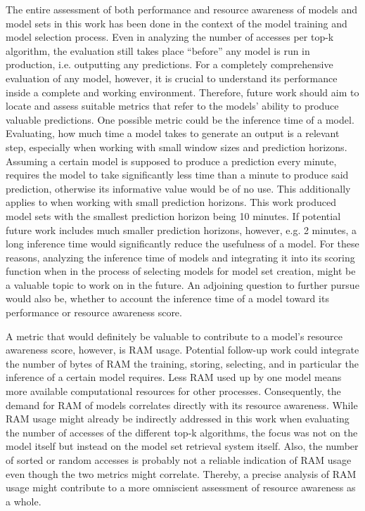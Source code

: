 The entire assessment of both performance and resource awareness of models and model sets in this work has been done in the context of the model training and model selection process. Even in analyzing the number of accesses per top-k algorithm, the evaluation still takes place “before” any model is run in production, i.e. outputting any predictions. For a completely comprehensive evaluation of any model, however, it is crucial to understand its performance inside a complete and working environment. Therefore, future work should aim to locate and assess suitable metrics that refer to the models' ability to produce valuable predictions. One possible metric could be the inference time of a model. Evaluating, how much time a model takes to generate an output is a relevant step, especially when working with small window sizes and prediction horizons. Assuming a certain model is supposed to produce a prediction every minute, requires the model to take significantly less time than a minute to produce said prediction, otherwise its informative value would be of no use. This additionally applies to when working with small prediction horizons. This work produced model sets with the smallest prediction horizon being 10 minutes. If potential future work includes much smaller prediction horizons, however, e.g. 2 minutes, a long inference time would significantly reduce the usefulness of a model. For these reasons, analyzing the inference time of models and integrating it into its scoring function when in the process of selecting models for model set creation, might be a valuable topic to work on in the future. An adjoining question to further pursue would also be, whether to account the inference time of a model toward its performance or resource awareness score. 

A metric that would definitely be valuable to contribute to a model's resource awareness score, however, is RAM usage. Potential follow-up work could integrate the number of bytes of RAM the training, storing, selecting, and in particular the inference of a certain model requires. Less RAM used up by one model means more available computational resources for other processes. Consequently, the demand for RAM of models correlates directly with its resource awareness. While RAM usage might already be indirectly addressed in this work when evaluating the number of accesses of the different top-k algorithms, the focus was not on the model itself but instead on the model set retrieval system itself. Also, the number of sorted or random accesses is probably not a reliable indication of RAM usage even though the two metrics might correlate. Thereby, a precise analysis of RAM usage might contribute to a more omniscient assessment of resource awareness as a whole.

